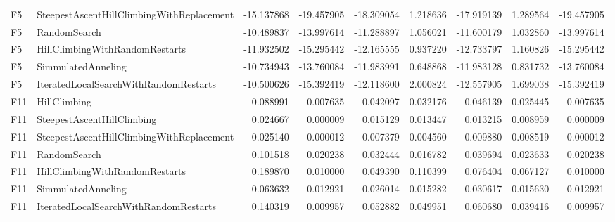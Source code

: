 \begin{tabular}{llrrrrrrr}
F5 & SteepestAscentHillClimbingWithReplacement & -15.137868 & -19.457905 & -18.309054 & 1.218636 & -17.919139 & 1.289564 & -19.457905 \\
F5 & RandomSearch & -10.489837 & -13.997614 & -11.288897 & 1.056021 & -11.600179 & 1.032860 & -13.997614 \\
F5 & HillClimbingWithRandomRestarts & -11.932502 & -15.295442 & -12.165555 & 0.937220 & -12.733797 & 1.160826 & -15.295442 \\
F5 & SimmulatedAnneling & -10.734943 & -13.760084 & -11.983991 & 0.648868 & -11.983128 & 0.831732 & -13.760084 \\
F5 & IteratedLocalSearchWithRandomRestarts & -10.500626 & -15.392419 & -12.118600 & 2.000824 & -12.557905 & 1.699038 & -15.392419 \\
F11 & HillClimbing & 0.088991 & 0.007635 & 0.042097 & 0.032176 & 0.046139 & 0.025445 & 0.007635 \\
F11 & SteepestAscentHillClimbing & 0.024667 & 0.000009 & 0.015129 & 0.013447 & 0.013215 & 0.008959 & 0.000009 \\
F11 & SteepestAscentHillClimbingWithReplacement & 0.025140 & 0.000012 & 0.007379 & 0.004560 & 0.009880 & 0.008519 & 0.000012 \\
F11 & RandomSearch & 0.101518 & 0.020238 & 0.032444 & 0.016782 & 0.039694 & 0.023633 & 0.020238 \\
F11 & HillClimbingWithRandomRestarts & 0.189870 & 0.010000 & 0.049390 & 0.110399 & 0.076404 & 0.067127 & 0.010000 \\
F11 & SimmulatedAnneling & 0.063632 & 0.012921 & 0.026014 & 0.015282 & 0.030617 & 0.015630 & 0.012921 \\
F11 & IteratedLocalSearchWithRandomRestarts & 0.140319 & 0.009957 & 0.052882 & 0.049951 & 0.060680 & 0.039416 & 0.009957 \\
\bottomrule
\end{tabular}
